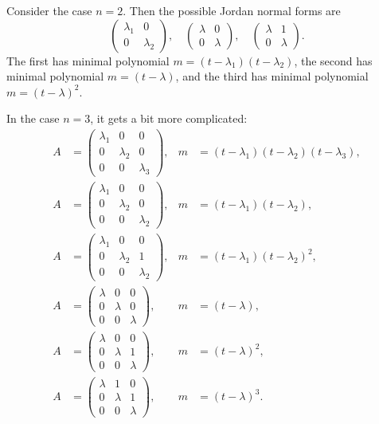 \documentclass[12pt]{article}
\begin{document}
\begin{exbox}
	Consider the case $n = 2$. Then the possible Jordan normal forms are
	\[
	\begin{pmatrix}
		\lambda_1 & 0 \\
		0 & \lambda_2
	\end{pmatrix}
	, \quad
	\begin{pmatrix}
		\lambda & 0 \\
		0 & \lambda
	\end{pmatrix}
	, \quad
	\begin{pmatrix}
		\lambda & 1 \\
		0 & \lambda
	\end{pmatrix}
	.\]
	The first has minimal polynomial $m = (t - \lambda_1)(t - \lambda_2)$, the second has minimal polynomial $m = (t - \lambda)$, and the third has minimal polynomial $m = (t - \lambda)^2$.

	In the case $n = 3$, it gets a bit more complicated:
	\begin{align*}
		A &= \begin{pmatrix}
			\lambda_1 & 0 & 0 \\
			0 & \lambda_2 & 0 \\
			0 & 0 & \lambda_3
		\end{pmatrix},& m &= (t - \lambda_1)(t - \lambda_2)(t - \lambda_3), \\
			A &= \begin{pmatrix}
			\lambda_1 & 0 & 0 \\
			0 & \lambda_2 & 0 \\
			0 & 0 & \lambda_2
		\end{pmatrix},& m &= (t - \lambda_1)(t - \lambda_2), \\
		A &= \begin{pmatrix}
			\lambda_1 & 0 & 0 \\
			0 & \lambda_2 & 1 \\
			0 & 0 & \lambda_2
		\end{pmatrix},& m &= (t - \lambda_1)(t - \lambda_2)^2, \\
		A &= \begin{pmatrix}
			\lambda & 0 & 0 \\
			0 & \lambda & 0 \\
			0 & 0 & \lambda
		\end{pmatrix},& m &= (t - \lambda), \\
		A &= \begin{pmatrix}
			\lambda & 0 & 0 \\
			0 & \lambda & 1 \\
			0 & 0 & \lambda
		\end{pmatrix},& m &= (t - \lambda)^2, \\
		A &= \begin{pmatrix}
			\lambda & 1 & 0 \\
			0 & \lambda & 1 \\
			0 & 0 & \lambda
		\end{pmatrix},& m &= (t - \lambda)^3.
	\end{align*}
\end{exbox}
\end{document}
